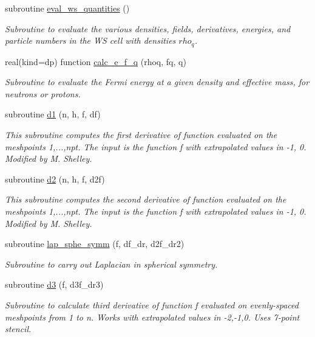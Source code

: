 \begin{DoxyCompactItemize}
subroutine \mbox{\hyperlink{namespaceroutines_a93de76f3b26ead66893f46dc4892dbcb}{eval\+\_\+ws\+\_\+quantities}} ()
\begin{DoxyCompactList}\small\item\em Subroutine to evaluate the various densities, fields, derivatives, energies, and particle numbers in the WS cell with densities $rho_q$. \end{DoxyCompactList}\item 
real(kind=dp) function \mbox{\hyperlink{namespaceroutines_a8f2a013c7bb06da429f995e288515248}{calc\+\_\+e\+\_\+f\+\_\+q}} (rhoq, fq, q)
\begin{DoxyCompactList}\small\item\em Subroutine to evaluate the Fermi energy at a given density and effective mass, for neutrons or protons. \end{DoxyCompactList}\item 
subroutine \mbox{\hyperlink{namespaceroutines_a92e52c281532c938dfa10d85404a367a}{d1}} (n, h, f, df)
\begin{DoxyCompactList}\small\item\em This subroutine computes the first derivative of function evaluated on the meshpoints 1,...,npt. The input is the function f with extrapolated values in -\/1, 0. Modified by M. Shelley. \end{DoxyCompactList}\item 
subroutine \mbox{\hyperlink{namespaceroutines_aafc8447e9af12216ae995f63c1606f1a}{d2}} (n, h, f, d2f)
\begin{DoxyCompactList}\small\item\em This subroutine computes the second derivative of function evaluated on the meshpoints 1,...,npt. The input is the function f with extrapolated values in -\/1, 0. Modified by M. Shelley. \end{DoxyCompactList}\item 
subroutine \mbox{\hyperlink{namespaceroutines_a635a2461a6c20207dd3b268842381ce3}{lap\+\_\+sphe\+\_\+symm}} (f, df\+\_\+dr, d2f\+\_\+dr2)
\begin{DoxyCompactList}\small\item\em Subroutine to carry out Laplacian in spherical symmetry. \end{DoxyCompactList}\item 
subroutine \mbox{\hyperlink{namespaceroutines_ac563b00969cb307d71ebc02aaef0a3b4}{d3}} (f, d3f\+\_\+dr3)
\begin{DoxyCompactList}\small\item\em Subroutine to calculate third derivative of function f evaluated on evenly-\/spaced meshpoints from 1 to n. Works with extrapolated values in -\/2,-\/1,0. Uses 7-\/point stencil. \end{DoxyCompactList}\item 

\end{DoxyCompactItemize}

